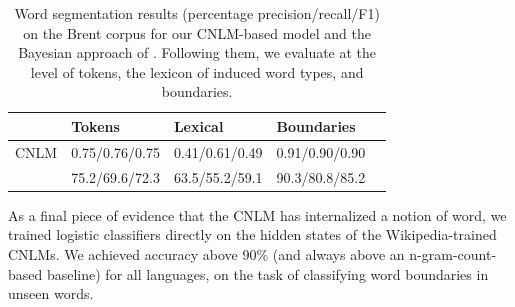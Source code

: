 

\begin{table}[t]
  \begin{center}
    \begin{tabular}{l|l|l|l|l}
      &Tokens & Lexical & Boundaries\\      \hline
	    CNLM & 0.75/0.76/0.75 & 0.41/0.61/0.49 & 0.91/0.90/0.90 \\
	    \citet{goldwater-bayesian-2009} & 75.2/69.6/72.3 & 63.5/55.2/59.1 & 90.3/80.8/85.2
    \end{tabular}
  \end{center}
	\caption{\label{tab:segmentation-results-brent} Word segmentation results (percentage precision/recall/F1)  on the Brent corpus for our CNLM-based model and the Bayesian approach of . Following them, we evaluate at the level of tokens, the lexicon of induced word types, and boundaries.}
\end{table}

As a final piece of evidence that the CNLM has internalized a notion
of word, we trained logistic classifiers directly on the hidden states
of the Wikipedia-trained CNLMs. We achieved accuracy above 90\% (and
always above an n-gram-count-based baseline) for all languages, on the
task of classifying word boundaries in unseen words.

